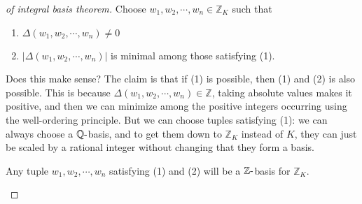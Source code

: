 \begin{proof}[of integral basis theorem]

Choose \({ {w}_1, {w}_2, \cdots, {w}_{n}} \in {\mathbb{Z}}_K\) such that

\begin{enumerate}
\def\labelenumi{\arabic{enumi}.}
\tightlist
\item
  \({\Delta}({ {w}_1, {w}_2, \cdots, {w}_{n}} ) \neq 0\)
\item
  \({\left\lvert { {\Delta}({ {w}_1, {w}_2, \cdots, {w}_{n}} ) } \right\rvert}\)
  is minimal among those satisfying (1).
\end{enumerate}

Does this make sense? The claim is that if (1) is possible, then (1) and
(2) is also possible. This is because
\({\Delta}({ {w}_1, {w}_2, \cdots, {w}_{n}} ) \in {\mathbb{Z}}\), taking
absolute values makes it positive, and then we can minimize among the
positive integers occurring using the well-ordering principle. But we
can choose tuples satisfying (1): we can always choose a
\({\mathbb{Q}}{\hbox{-}}\)basis, and to get them down to
\({\mathbb{Z}}_K\) instead of \(K\), they can just be scaled by a
rational integer without changing that they form a basis.

\begin{claim}

Any tuple \({ {w}_1, {w}_2, \cdots, {w}_{n}}\) satisfying (1) and (2)
will be a \({\mathbb{Z}}{\hbox{-}}\)basis for \({\mathbb{Z}}_K\).

\end{claim}


\end{proof}
